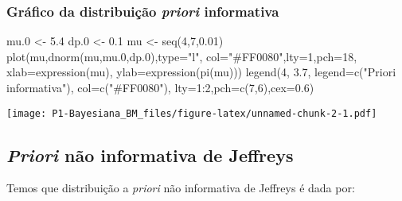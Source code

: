 \documentclass[
]{article}
\newenvironment{Shaded}{\begin{snugshade}}{\end{snugshade}}
\newcommand{\AttributeTok}[1]{\textcolor[rgb]{0.77,0.63,0.00}{#1}}
\newcommand{\DecValTok}[1]{\textcolor[rgb]{0.00,0.00,0.81}{#1}}
\newcommand{\FloatTok}[1]{\textcolor[rgb]{0.00,0.00,0.81}{#1}}
\newcommand{\FunctionTok}[1]{\textcolor[rgb]{0.00,0.00,0.00}{#1}}
\newcommand{\NormalTok}[1]{#1}
\newcommand{\OtherTok}[1]{\textcolor[rgb]{0.56,0.35,0.01}{#1}}
\newcommand{\SpecialCharTok}[1]{\textcolor[rgb]{0.00,0.00,0.00}{#1}}
\newcommand{\StringTok}[1]{\textcolor[rgb]{0.31,0.60,0.02}{#1}}
\begin{document}
\hypertarget{gruxe1fico-da-distribuiuxe7uxe3o-priori-informativa}{%
\subsubsection{\texorpdfstring{Gráfico da distribuição \emph{priori}
informativa}{Gráfico da distribuição priori informativa}}\label{gruxe1fico-da-distribuiuxe7uxe3o-priori-informativa}}

\begin{Shaded}
\begin{Highlighting}[]
\NormalTok{mu}\FloatTok{.0} \OtherTok{\textless{}{-}} \FloatTok{5.4}
\NormalTok{dp}\FloatTok{.0} \OtherTok{\textless{}{-}} \FloatTok{0.1}
\NormalTok{mu }\OtherTok{\textless{}{-}} \FunctionTok{seq}\NormalTok{(}\DecValTok{4}\NormalTok{,}\DecValTok{7}\NormalTok{,}\FloatTok{0.01}\NormalTok{)}
\FunctionTok{plot}\NormalTok{(mu,}\FunctionTok{dnorm}\NormalTok{(mu,mu}\FloatTok{.0}\NormalTok{,dp}\FloatTok{.0}\NormalTok{),}\AttributeTok{type=}\StringTok{"l"}\NormalTok{,}
     \AttributeTok{col=}\StringTok{"\#FF0080"}\NormalTok{,}\AttributeTok{lty=}\DecValTok{1}\NormalTok{,}\AttributeTok{pch=}\DecValTok{18}\NormalTok{,   }
     \AttributeTok{xlab=}\FunctionTok{expression}\NormalTok{(mu),}
     \AttributeTok{ylab=}\FunctionTok{expression}\NormalTok{(}\FunctionTok{pi}\NormalTok{(mu)))}
\FunctionTok{legend}\NormalTok{(}\DecValTok{4}\NormalTok{, }\FloatTok{3.7}\NormalTok{,}
       \AttributeTok{legend=}\FunctionTok{c}\NormalTok{(}\StringTok{"Priori informativa"}\NormalTok{),}
       \AttributeTok{col=}\FunctionTok{c}\NormalTok{(}\StringTok{"\#FF0080"}\NormalTok{),}
       \AttributeTok{lty=}\DecValTok{1}\SpecialCharTok{:}\DecValTok{2}\NormalTok{,}\AttributeTok{pch=}\FunctionTok{c}\NormalTok{(}\DecValTok{7}\NormalTok{,}\DecValTok{6}\NormalTok{),}\AttributeTok{cex=}\FloatTok{0.6}\NormalTok{)}
\end{Highlighting}
\end{Shaded}

\texttt{[image: P1-Bayesiana\_BM\_files/figure-latex/unnamed-chunk-2-1.pdf]}

\hypertarget{priori-nuxe3o-informativa-de-jeffreys}{%
\subsection{\texorpdfstring{\emph{Priori} não informativa de
Jeffreys}{Priori não informativa de Jeffreys}}\label{priori-nuxe3o-informativa-de-jeffreys}}

Temos que distribuição a \emph{priori} não informativa de Jeffreys é
dada por:
\end{document}
